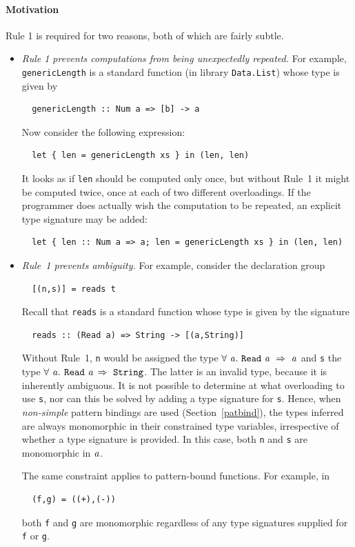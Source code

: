 \paragraph*{Motivation}

Rule 1 is required for two reasons, both of which are fairly subtle.
\begin{itemize}
\item
{\em Rule 1 prevents computations from being unexpectedly repeated.}
For example, \mbox{\tt genericLength} is a standard function (in library \mbox{\tt Data.List}) whose
type is given by
\bprog
{\small\begin{verbatim}
  genericLength :: Num a => [b] -> a
\end{verbatim}}
\eprog
Now consider the following expression:
\bprog
{\small\begin{verbatim}
  let { len = genericLength xs } in (len, len)
\end{verbatim}}
\eprog
It looks as if \mbox{\tt len} should be computed only once, but without Rule~1 it might
be computed twice, once at each of two different overloadings.  If the 
programmer does actually wish the computation to be repeated, an explicit
type signature may be added:
\bprog
{\small\begin{verbatim}
  let { len :: Num a => a; len = genericLength xs } in (len, len)
\end{verbatim}}
\eprog

\item {\em Rule~1 prevents ambiguity.}  For example, consider the declaration
group
\bprog
{\small\begin{verbatim}
  [(n,s)] = reads t
\end{verbatim}}
\eprog
Recall that \mbox{\tt reads} is a standard function whose type is given by the
signature
\bprog
{\small\begin{verbatim}
  reads :: (Read a) => String -> [(a,String)]
\end{verbatim}}
\eprog
Without Rule~1, \mbox{\tt n} would be assigned the 
type \mbox{$\it \forall\ a.~\makebox{\tt Read}~a\ \Rightarrow\ a$} 
and \mbox{\tt s} the type \mbox{$\it \forall\ a.$} \mbox{$\it \makebox{\tt Read}~a$} \mbox{$\it \Rightarrow\ \makebox{\tt String}$}.
The latter is an invalid type, because it is inherently ambiguous.
It is not possible to determine at what overloading to use \mbox{\tt s}, nor
can this be solved by adding a type signature for \mbox{\tt s}.
Hence, when {\em non-simple} pattern bindings
are used (Section~\ref{patbind}), the types inferred are 
always monomorphic in their constrained type variables, irrespective of whether
a type signature is provided.
In this case, both \mbox{\tt n} and \mbox{\tt s} are monomorphic in \mbox{$\it a$}.

The same constraint applies to pattern-bound functions.  For example, in
\bprog
{\small\begin{verbatim}
  (f,g) = ((+),(-))
\end{verbatim}}
\eprog
both \mbox{\tt f} and \mbox{\tt g} are monomorphic regardless of any type
signatures supplied for \mbox{\tt f} or \mbox{\tt g}.
\end{itemize}

